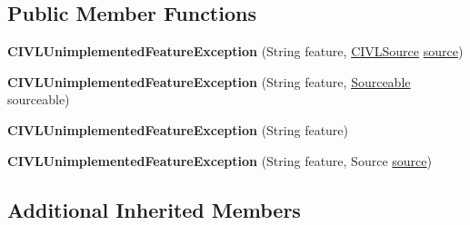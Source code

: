 \subsection*{Public Member Functions}
\begin{DoxyCompactItemize}
\item 
\hypertarget{classedu_1_1udel_1_1cis_1_1vsl_1_1civl_1_1model_1_1IF_1_1CIVLUnimplementedFeatureException_a07d8e3943cad7bf750c1072956e8d2ac}{}{\bfseries C\+I\+V\+L\+Unimplemented\+Feature\+Exception} (String feature, \hyperlink{interfaceedu_1_1udel_1_1cis_1_1vsl_1_1civl_1_1model_1_1IF_1_1CIVLSource}{C\+I\+V\+L\+Source} \hyperlink{classedu_1_1udel_1_1cis_1_1vsl_1_1civl_1_1model_1_1IF_1_1CIVLException_a29eba9d3541bcd7e2306404c6ece4d98}{source})\label{classedu_1_1udel_1_1cis_1_1vsl_1_1civl_1_1model_1_1IF_1_1CIVLUnimplementedFeatureException_a07d8e3943cad7bf750c1072956e8d2ac}

\item 
\hypertarget{classedu_1_1udel_1_1cis_1_1vsl_1_1civl_1_1model_1_1IF_1_1CIVLUnimplementedFeatureException_acb3cd87cbaecd7e93193992210f60afb}{}{\bfseries C\+I\+V\+L\+Unimplemented\+Feature\+Exception} (String feature, \hyperlink{interfaceedu_1_1udel_1_1cis_1_1vsl_1_1civl_1_1model_1_1IF_1_1Sourceable}{Sourceable} sourceable)\label{classedu_1_1udel_1_1cis_1_1vsl_1_1civl_1_1model_1_1IF_1_1CIVLUnimplementedFeatureException_acb3cd87cbaecd7e93193992210f60afb}

\item 
\hypertarget{classedu_1_1udel_1_1cis_1_1vsl_1_1civl_1_1model_1_1IF_1_1CIVLUnimplementedFeatureException_aee5697884d6591e179c2f601e906548a}{}{\bfseries C\+I\+V\+L\+Unimplemented\+Feature\+Exception} (String feature)\label{classedu_1_1udel_1_1cis_1_1vsl_1_1civl_1_1model_1_1IF_1_1CIVLUnimplementedFeatureException_aee5697884d6591e179c2f601e906548a}

\item 
\hypertarget{classedu_1_1udel_1_1cis_1_1vsl_1_1civl_1_1model_1_1IF_1_1CIVLUnimplementedFeatureException_ae21484675a0e876d2d80d708cae8b00c}{}{\bfseries C\+I\+V\+L\+Unimplemented\+Feature\+Exception} (String feature, Source \hyperlink{classedu_1_1udel_1_1cis_1_1vsl_1_1civl_1_1model_1_1IF_1_1CIVLException_a29eba9d3541bcd7e2306404c6ece4d98}{source})\label{classedu_1_1udel_1_1cis_1_1vsl_1_1civl_1_1model_1_1IF_1_1CIVLUnimplementedFeatureException_ae21484675a0e876d2d80d708cae8b00c}

\end{DoxyCompactItemize}
\subsection*{Additional Inherited Members}


